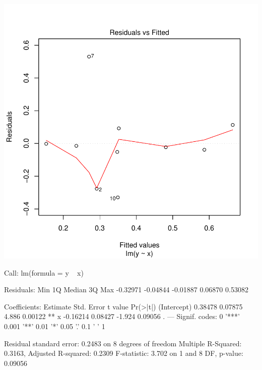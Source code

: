 \documentclass[11pt]{report}
\begin{document}
\includegraphics{swtest-001}

\begin{Schunk}
\begin{Soutput}
Call:
lm(formula = y ~ x)

Residuals:
     Min       1Q   Median       3Q      Max 
-0.32971 -0.04844 -0.01887  0.06870  0.53082 

Coefficients:
            Estimate Std. Error t value Pr(>|t|)   
(Intercept)  0.38478    0.07875   4.886  0.00122 **
x           -0.16214    0.08427  -1.924  0.09056 . 
---
Signif. codes:  0 '***' 0.001 '**' 0.01 '*' 0.05 '.' 0.1 ' ' 1 

Residual standard error: 0.2483 on 8 degrees of freedom
Multiple R-Squared: 0.3163,	Adjusted R-squared: 0.2309 
F-statistic: 3.702 on 1 and 8 DF,  p-value: 0.09056 
\end{Soutput}
\end{Schunk}
\end{document}
